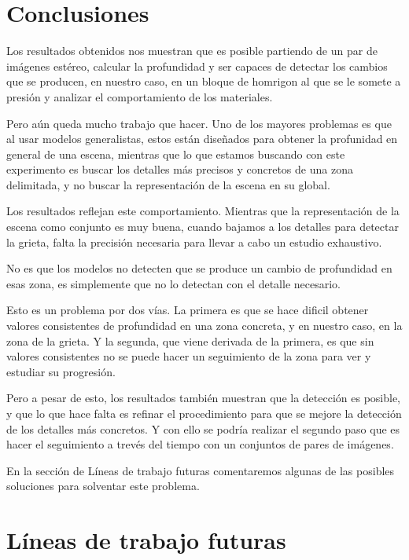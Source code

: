 
\section{Conclusiones}
Los resultados obtenidos nos muestran que es posible partiendo de un par de imágenes estéreo, calcular la profundidad y ser capaces de detectar los cambios que se producen, en nuestro caso, en un bloque de homrigon al que se le somete a presión y analizar el comportamiento de los materiales.

Pero aún queda mucho trabajo que hacer. Uno de los mayores problemas es que al usar modelos generalistas, estos están diseñados para obtener la profunidad en general de una escena, mientras que lo que estamos buscando con este experimento es buscar los detalles más precisos y concretos de una zona delimitada, y no buscar la representación de la escena en su global.

Los resultados reflejan este comportamiento. Mientras que la representación de la escena como conjunto es muy buena, cuando bajamos a los detalles para detectar la grieta, falta la precisión necesaria para llevar a cabo un estudio exhaustivo.

No es que los modelos no detecten que se produce un cambio de profundidad en esas zona, es simplemente que no lo detectan con el detalle necesario.

Esto es un problema por dos vías. La primera es que se hace dificil obtener valores consistentes de profundidad en una zona concreta, y en nuestro caso, en la zona de la grieta. Y la segunda, que viene derivada de la primera, es que sin valores consistentes no se puede hacer un seguimiento de la zona para ver y estudiar su progresión.

Pero a pesar de esto, los resultados también muestran que la detección es posible, y que lo que hace falta es refinar el procedimiento para que se mejore la detección de los detalles más concretos. Y con ello se podría realizar el segundo paso que es hacer el seguimiento a trevés del tiempo con un conjuntos de pares de imágenes.

En la sección de Líneas de trabajo futuras comentaremos algunas de las posibles soluciones para solventar este problema.

\section{Líneas de trabajo futuras}

